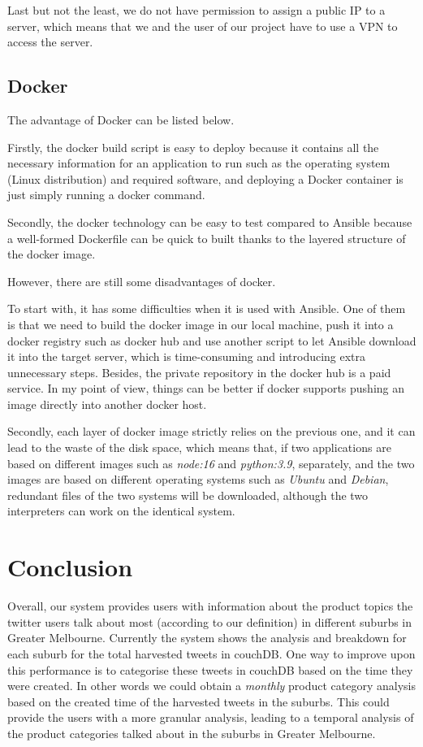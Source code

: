 \documentclass[parskip=full, 11pt]{article}
\begin{document}
Last but not the least, we do not have permission to assign a public IP to a server, which means that we and the user of our project have to use a VPN to access the server.

\subsection{Docker}
The advantage of Docker can be listed below.

Firstly, the docker build script is easy to deploy because it contains all the necessary information for an application to run such as the operating system (Linux distribution) and required software, and deploying a Docker container is just simply running a docker command.

Secondly, the docker technology can be easy to test compared to Ansible because a well-formed Dockerfile can be quick to built thanks to the layered structure of the docker image.

However, there are still some disadvantages of docker.

To start with, it has some difficulties when it is used with Ansible. One of them is that we need to build the docker image in our local machine, push it into a docker registry such as docker hub and use another script to let Ansible download it into the target server, which is time-consuming and introducing extra unnecessary steps. Besides, the private repository in the docker hub is a paid service. In my point of view, things can be better if docker supports pushing an image directly into another docker host.

Secondly, each layer of docker image strictly relies on the previous one, and it can lead to the waste of the disk space, which means that, if two applications are based on different images such as \emph{node:16} and \emph{python:3.9}, separately, and the two images are based on different operating systems such as \emph{Ubuntu} and \emph{Debian}, redundant files of the two systems will be downloaded, although the two interpreters can work on the identical system.

\section{Conclusion}

Overall, our system provides users with information about the product topics the twitter users talk about most (according to our definition) in different suburbs in Greater Melbourne. Currently the system shows the analysis and breakdown for each suburb for the total harvested tweets in couchDB. One way to improve upon this performance is to categorise these tweets in couchDB based on the time they were created. In other words we could obtain a \emph{monthly} product category analysis based on the created time of the harvested tweets in the suburbs. This could provide the users with a more granular analysis, leading to a temporal analysis of the product categories talked about in the suburbs in Greater Melbourne. 
\end{document}
